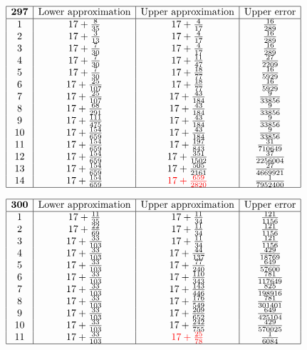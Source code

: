 \documentclass{amsart}
\begin{document}
$$\begin{array}{|c|c|c|c|}
 \hline
 {\bf 297}&\text{Lower approximation}&\text{Upper approximation}&\text{Upper error}\\
 \hline
 1&17+\frac{8}{35}&17+\frac{4}{17}&\frac{16}{289}\\
2&17+\frac{3}{13}&17+\frac{4}{17}&\frac{16}{289}\\
3&17+\frac{7}{30}&17+\frac{4}{17}&\frac{16}{289}\\
4&17+\frac{7}{30}&17+\frac{11}{47}&\frac{27}{2209}\\
5&17+\frac{7}{30}&17+\frac{18}{77}&\frac{16}{5929}\\
6&17+\frac{25}{107}&17+\frac{18}{77}&\frac{16}{5929}\\
7&17+\frac{25}{107}&17+\frac{43}{184}&\frac{9}{33856}\\
8&17+\frac{68}{291}&17+\frac{43}{184}&\frac{9}{33856}\\
9&17+\frac{111}{475}&17+\frac{43}{184}&\frac{9}{33856}\\
10&17+\frac{154}{659}&17+\frac{43}{184}&\frac{9}{33856}\\
11&17+\frac{154}{659}&17+\frac{197}{843}&\frac{31}{710649}\\
12&17+\frac{154}{659}&17+\frac{351}{1502}&\frac{37}{2256004}\\
13&17+\frac{154}{659}&17+\frac{505}{2161}&\frac{27}{4669921}\\
14&17+\frac{154}{659}&{\color{red}17+\frac{659}{2820}}&\frac{1}{7952400}\\
 \hline
\end{array}$$

$$\begin{array}{|c|c|c|c|}
 \hline
 {\bf 300}&\text{Lower approximation}&\text{Upper approximation}&\text{Upper error}\\
 \hline
 1&17+\frac{11}{35}&17+\frac{11}{34}&\frac{121}{1156}\\
2&17+\frac{22}{69}&17+\frac{11}{34}&\frac{121}{1156}\\
3&17+\frac{33}{103}&17+\frac{11}{34}&\frac{121}{1156}\\
4&17+\frac{33}{103}&17+\frac{44}{137}&\frac{429}{18769}\\
5&17+\frac{33}{103}&17+\frac{77}{240}&\frac{649}{57600}\\
6&17+\frac{33}{103}&17+\frac{110}{343}&\frac{781}{117649}\\
7&17+\frac{33}{103}&17+\frac{143}{446}&\frac{825}{198916}\\
8&17+\frac{33}{103}&17+\frac{176}{549}&\frac{781}{301401}\\
9&17+\frac{33}{103}&17+\frac{209}{652}&\frac{649}{425104}\\
10&17+\frac{33}{103}&17+\frac{242}{755}&\frac{429}{570025}\\
11&17+\frac{33}{103}&{\color{red}17+\frac{25}{78}}&\frac{1}{6084}\\
 \hline
\end{array}$$
\end{document}
